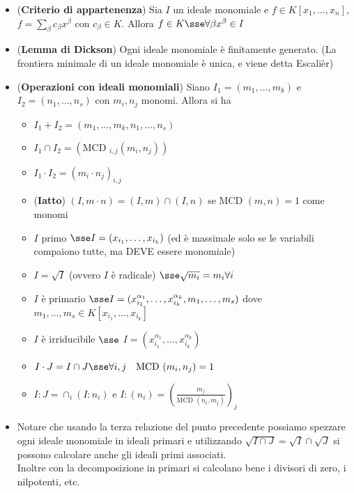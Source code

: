 \documentclass[a4paper,NoNotes,GeneralMath]{stdmdoc}
\newcommand{\MCD}{\text{MCD }}
\begin{document}
	\begin{itemize}
		\item ({\bf Criterio di appartenenza}) Sia $I$ un ideale monomiale e $f \in K[x_1, \ldots, x_n]$, $f = \sum_\beta c_\beta x^\beta$ con $c_\beta \in K$. Allora $f \in K \sse \forall \beta x^\beta \in I$
		\item ({\bf Lemma di Dickson}) Ogni ideale monomiale è finitamente generato. (La frontiera minimale di un ideale monomiale è unica, e viene detta Escalièr)
		\item ({\bf Operazioni con ideali monomiali}) Siano $I_1 = (m_1, \ldots, m_k)$ e $I_2 = (n_1, \ldots, n_s)$ con $m_i, n_j$ monomi. Allora si ha
			\begin{itemize}
				\item $I_1 + I_2 = (m_1, \ldots, m_k, n_1, \ldots, n_s)$
				\item $I_1 \cap I_2 = (\MCD_{i,j} (m_i, n_j))$
				\item $I_1 \cdot I_2 = (m_i \cdot n_j)_{i,j}$
				\item ({\bf Iatto}) $(I, m \cdot n) = (I, m) \cap (I, n)$ se $\MCD(m, n) = 1$ come monomi
				\item $I$ primo $\sse I = (x_{i_1}, \ldots, x_{i_k})$ (ed è massimale solo se le variabili compaiono tutte, ma DEVE essere monomiale)
				\item $I = \sqrt{I}$ (ovvero $I$ è radicale) $\sse \sqrt{m_i} = m_i \forall i$
				\item $I$ è primario $\sse I = (x_{i_1}^{\alpha_1}, \ldots, x_{i_k}^{\alpha_k}, m_1, \ldots, m_s)$ dove $m_1, \ldots, m_s \in K[x_{i_1}, \ldots, x_{i_k}]$
				\item $I$ è irriducibile $\sse$ $I = (x_{i_1}^{\alpha_1}, \ldots, x_{i_k}^{\alpha_k})$
				\item $I\cdot J = I \cap J \sse \forall i,j \quad \MCD(m_i, n_j) = 1$
				\item $I : J = \cap_i (I : n_i)$ e $I : (n_i) = (\frac{m_j}{\MCD(n_i, m_j)})_{j}$
			\end{itemize}
		\item Notare che usando la terza relazione del punto precedente possiamo spezzare ogni ideale monomiale in ideali primari e utilizzando $\sqrt{I \cap J} = \sqrt{I} \cap \sqrt{J}$ si possono calcolare anche gli ideali primi associati. \\
			Inoltre con la decomposizione in primari si calcolano bene i divisori di zero, i nilpotenti, etc.
	\end{itemize}
	
\end{document}
